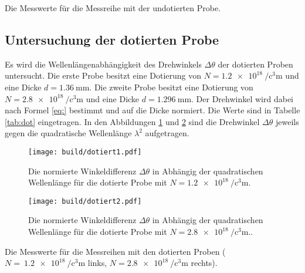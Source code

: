 \begin{table}
	\centering
	\caption{Die Messwerte für die Messreihe mit der undotierten Probe.}
	
	\label{tab:undot}
\end{table}

\subsection{Untersuchung der dotierten Probe}
Es wird die Wellenlängenabhängigkeit des Drehwinkels $\Delta\theta$ der dotierten Proben untersucht. Die erste Probe besitzt eine Dotierung von $N=\SI{1.2e18}{\per\cubic\centi\metre}$ und eine Dicke $d=\SI{1.36}{\milli\metre}$. Die zweite Probe besitzt eine Dotierung von $N=\SI{2.8e18}{\per\cubic\centi\metre}$ und eine Dicke $d=\SI{1.296}{\milli\metre}$. Der Drehwinkel wird dabei nach Formel \eqref{eq:} bestimmt und auf die Dicke normiert. Die Werte sind in Tabelle \ref{tab:dot} eingetragen. In den Abbildungen \ref{fig:dot1} und \ref{fig:dot2} sind die Drehwinkel $\Delta\theta$ jeweils gegen die quadratische Wellenlänge $\lambda^2$ aufgetragen.

\begin{figure}
	\centering
	\texttt{[image: build/dotiert1.pdf]}
	\caption{Die normierte Winkeldifferenz $\Delta\theta$ in Abhängig der quadratischen Wellenlänge für die dotierte Probe mit $N=\SI{1.2e18}{\per\cubic\centi\metre}$.}
	\label{fig:dot1}
\end{figure}

\begin{figure}
	\centering
	\texttt{[image: build/dotiert2.pdf]}
	\caption{Die normierte Winkeldifferenz $\Delta\theta$ in Abhängig der quadratischen Wellenlänge für die dotierte Probe mit $N=\SI{2.8e18}{\per\cubic\centi\metre}$..}
	\label{fig:dot2}
\end{figure}

\begin{table}
	\centering
	\caption{Die Messwerte für die Messreihen mit den dotierten Proben ($N=~\SI{1.2e18}{\per\cubic\centi\metre}$ links, $N=\SI{2.8e18}{\per\cubic\centi\metre}$ rechts).}
	
	
	\label{tab:dot}
\end{table}
\newpage

